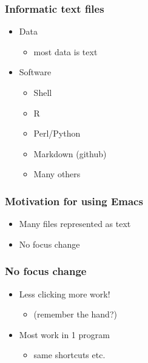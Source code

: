\documentclass[t,10pt]{beamer}
\begin{document}
\begin{frame}
\frametitle{Informatic text files}
\label{sec-1-3}
\begin{itemize}

\item Data
\label{sec-1-3-1}%
\begin{itemize}
\item most data is text
\end{itemize}

\vspace{0.25in}


\item Software
\label{sec-1-3-2}%
\begin{itemize}
\item Shell
\item R
\item Perl/Python
\item Markdown (github)
\item Many others
\end{itemize}


\end{itemize} %
\end{frame}
\begin{frame}
\frametitle{Motivation for using Emacs}
\label{sec-1-4}

\begin{itemize}
\item Many files represented as text
\item No focus change
\end{itemize}
 
\end{frame}
\begin{frame}
\frametitle{No focus change}
\label{sec-1-5}

\begin{itemize}
\item Less clicking more work!
\begin{itemize}
\item (remember the hand?)
\end{itemize}
\end{itemize}
\vspace{0.25in}
\begin{itemize}
\item Most work in 1 program
\begin{itemize}
\item same shortcuts etc.
\end{itemize}
\end{itemize}
\end{frame}
\end{document}
